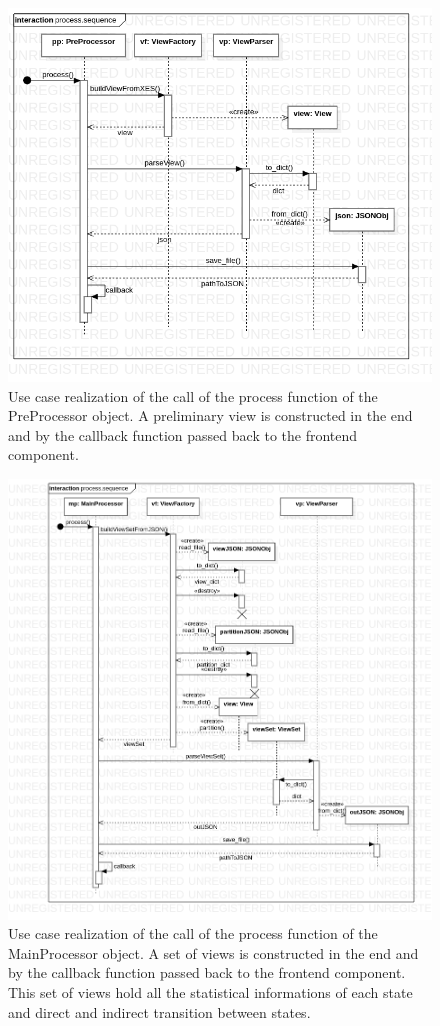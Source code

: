 \documentclass[12pt]{extarticle}
\begin{document}
\begin{figure}[H]
    \centering
    \includegraphics[width=\textwidth]{presequence.png}
    \caption{Use case realization of the call of the process function of the PreProcessor object. A preliminary view is constructed in the end and by the callback function passed back to the frontend component.}
    \label{fig:presequence}
\end{figure}

\begin{figure}[H]
    \centering
    \includegraphics[width=\textwidth]{mainsequence.png}
    \caption{Use case realization of the call of the process function of the MainProcessor object. A set of views is constructed in the end and by the callback function passed back to the frontend component. This set of views hold all the statistical informations of each state and direct and indirect transition between states.}
    \label{fig:mainsequence}
\end{figure}
\end{document}
